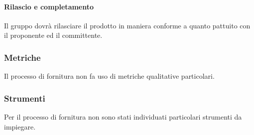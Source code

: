 		\paragraph{Rilascio e completamento}
			Il gruppo dovrà rilasciare il prodotto in maniera conforme a quanto pattuito con il proponente ed il committente.
	\subsubsection{Metriche}
		Il processo di fornitura non fa uso di metriche qualitative particolari.
	\subsubsection{Strumenti}
		Per il processo di fornitura non sono stati individuati particolari strumenti da impiegare.